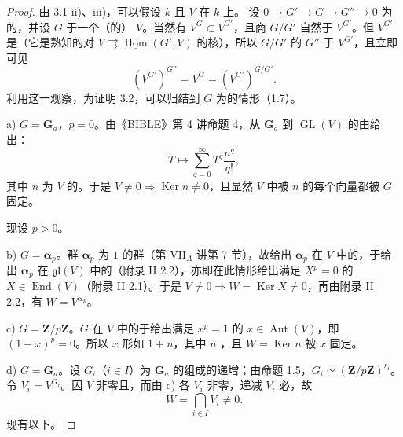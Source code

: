 \begin{proof}
由 3.1 ii)、iii)，可以假设 $k$ 且 $V$ 在 $k$ 上。
设 $0\to G'\to G\to G''\to0$ 为的，并设 $G$ 于一个（的） $V$。当然有 $V^G\subset V^{G'}$，且商 $G/G'$ 自然于 $V^{G'}$。但 $V^{G'}$ 是（它是熟知的对 $V\rightrightarrows\underline{\operatorname{Hom}}(G',V)$ 的核），所以 $G/G'$ 的 $G''$ 于 $V^{G'}$，且立即可见
\[(V^{G'})^{G''}=V^G=(V^{G'})^{G/G'}.\]
利用这一观察，为证明 3.2，可以归结到 $G$ 为的情形（1.7）。

a) $G=\mathbf G_a$，$p=0$。由《BIBLE》第 4 讲命题 4，从 $\mathbf G_a$ 到 $\operatorname{GL}(V)$ 的由给出：
\[T\longmapsto\sum_{q=0}^{\infty}T^q\frac{n^q}{q!},\]
其中 $n$ 为 $V$ 的。于是 $V\ne0\Rightarrow\operatorname{Ker}n\ne0$，且显然 $V$ 中被 $n$ 的每个向量都被 $G$ 固定。

现设 $p>0$。

b) $G=\boldsymbol\alpha_p$。群 $\boldsymbol\alpha_p$ 为 $1$ 的群（第 VII$_A$ 讲第 7 节），故给出 $\boldsymbol\alpha_p$ 在 $V$ 中的，于给出 $\boldsymbol\alpha_p$ 在 $\mathfrak{gl}(V)$ 中的（附录 II 2.2），亦即在此情形给出满足 $X^p=0$ 的 $X\in\operatorname{End}(V)$（附录 II 2.1）。于是 $V\ne0\Rightarrow W=\operatorname{Ker}X\ne0$，再由附录 II 2.2，有 $W=V^{\boldsymbol\alpha_p}$。

c) $G=\mathbf Z/p\mathbf Z$。$G$ 在 $V$ 中的于给出满足 $x^p=1$ 的 $x\in\operatorname{Aut}(V)$，即 $(1-x)^p=0$。所以 $x$ 形如 $1+n$，其中 $n$ ，且 $W=\operatorname{Ker}n$ 被 $x$ 固定。

d) $G=\mathbf G_a$。设 $G_i$（$i\in I$）为 $\mathbf G_a$ 的组成的递增；由命题 1.5，$G_i\simeq(\mathbf Z/p\mathbf Z)^{r_i}$。令 $V_i=V^{G_i}$。因 $V$ 非零且，而由 c) 各 $V_i$ 非零，递减 $V_i$ 必，故
\[W=\bigcap_{i\in I}V_i\ne0.\]
现有以下。
\end{proof}
